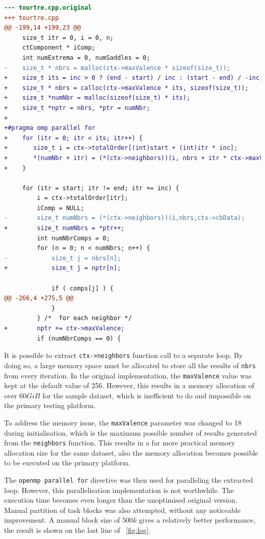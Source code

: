 \documentclass[conference]{IEEEtran}
\newcommand{\fref}[1]{\figurename~\ref{#1}}
\begin{document}
\begin{lstlisting}[language=diff,label=lst:sweep,captionpos=b,caption={\texttt{ct\_sweep} code modification},float,floatplacement=t]
--- tourtre.cpp.original
+++ tourtre.cpp
@@ -199,14 +199,23 @@
     size_t itr = 0, i = 0, n;
     ctComponent * iComp;
     int numExtrema = 0, numSaddles = 0;
-    size_t * nbrs = malloc(ctx->maxValence * sizeof(size_t));
+    size_t its = inc > 0 ? (end - start) / inc : (start - end) / -inc;
+    size_t * nbrs = calloc(ctx->maxValence * its, sizeof(size_t));
+    size_t *numNbr = malloc(sizeof(size_t) * its);
+    size_t *nptr = nbrs, *ptr = numNbr;
+
+#pragma omp parallel for
+    for (itr = 0; itr < its; itr++) {
+       size_t i = ctx->totalOrder[(int)start + (int)itr * inc];
+       *(numNbr + itr) = (*(ctx->neighbors))(i, nbrs + itr * ctx->maxValence, ctx->cbData);
+    }

     for (itr = start; itr != end; itr += inc) {
         i = ctx->totalOrder[itr];
         iComp = NULL;
-        size_t numNbrs = (*(ctx->neighbors))(i,nbrs,ctx->cbData);
+        size_t numNbrs = *ptr++;
         int numNbrComps = 0;
         for (n = 0; n < numNbrs; n++) {
-            size_t j = nbrs[n];
+            size_t j = nptr[n];

             if ( comps[j] ) {
@@ -266,4 +275,5 @@
             }
         } /*  for each neighbor */
+        nptr += ctx->maxValence;
         if (numNbrComps == 0) {
\end{lstlisting}

It is possible to extract \texttt{ctx->neighbors} function call to a separate loop. By doing so, a large memory space must be allocated to store all the results of \texttt{nbrs} from every iteration. In the original implementation, the \texttt{maxValence} value was kept at the default value of 256. However, this results in a memory allocation of over $60 GiB$ for the sample dataset, which is inefficient to do and impossible on the primary testing platform.

To address the memory issue, the \texttt{maxValence} parameter was changed to 18 during initialisation, which is the maximum possible number of results generated from the \texttt{neighbors} function. This results in a far more practical memory allocation size for the same dataset, also the memory allocation becomes possible to be executed on the primary platform.

The \texttt{openmp parallel for} directive was then used for paralleling the extracted loop. However, this parallelisation implementation is not worthwhile. The execution time becomes even longer than the unoptimised original version. Manual partition of task blocks was also attempted, without any noticeable improvement. A manual block size of $500 k$ gives a relatively better performance, the result is shown on the last line of \fref{fig:log}.
\end{document}
